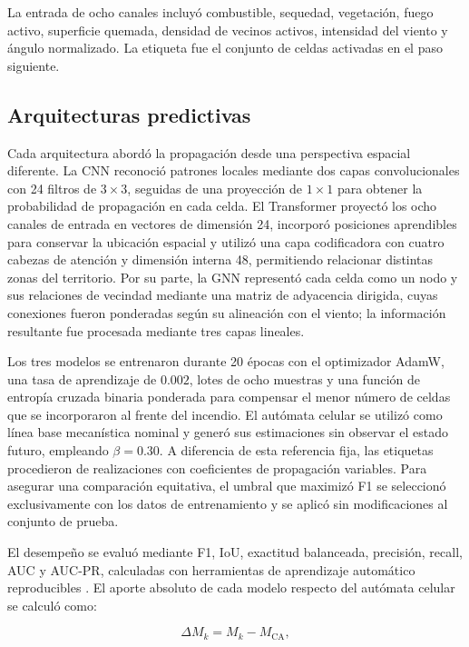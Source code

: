 \documentclass[fleqn,10pt]{wlscirep}
\begin{document}
La entrada de ocho canales incluyó combustible, sequedad, vegetación, fuego activo, superficie quemada, densidad de vecinos activos, intensidad del viento y ángulo normalizado. La etiqueta fue el conjunto de celdas activadas en el paso siguiente.

\subsection*{Arquitecturas predictivas}


Cada arquitectura abordó la propagación desde una perspectiva espacial
diferente. La CNN reconoció patrones locales mediante dos capas
convolucionales con 24 filtros de $3\times3$, seguidas de una proyección
de $1\times1$ para obtener la probabilidad de propagación en cada celda.
El Transformer proyectó los ocho canales de entrada en vectores de
dimensión 24, incorporó posiciones aprendibles para conservar la
ubicación espacial y utilizó una capa codificadora con cuatro cabezas
de atención y dimensión interna 48, permitiendo relacionar distintas
zonas del territorio. Por su parte, la GNN representó cada celda como
un nodo y sus relaciones de vecindad mediante una matriz de adyacencia
dirigida, cuyas conexiones fueron ponderadas según su alineación con
el viento; la información resultante fue procesada mediante tres capas
lineales.

Los tres modelos se entrenaron durante 20 épocas con el optimizador
AdamW, una tasa de aprendizaje de $0.002$, lotes de ocho muestras y una
función de entropía cruzada binaria ponderada para compensar el menor
número de celdas que se incorporaron al frente del incendio. El
autómata celular se utilizó como línea base mecanística nominal y generó sus
estimaciones sin observar el estado futuro, empleando $\beta=0.30$. A diferencia de esta referencia fija, las etiquetas procedieron de realizaciones con coeficientes de propagación variables. Para asegurar una
comparación equitativa, el umbral que maximizó F1 se seleccionó
exclusivamente con los datos de entrenamiento y se aplicó sin
modificaciones al conjunto de prueba.

El desempeño se evaluó mediante F1, IoU, exactitud balanceada,
precisión, recall, AUC y AUC-PR, calculadas con herramientas de
aprendizaje automático reproducibles \cite{pedregosa2011}. El aporte absoluto de cada modelo
respecto del autómata celular se calculó como:

\begin{equation}
\Delta M_k = M_k - M_{\mathrm{CA}},
\label{eq:delta_metric}
\end{equation}
\end{document}
